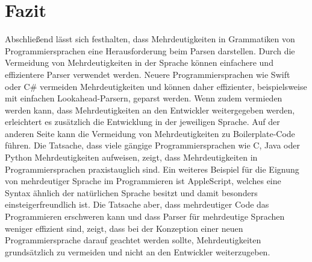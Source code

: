 \documentclass[runningheads]{llncs}
\begin{document}
    \section{Fazit}\label{sec:zusammenfassung}

    Abschließend lässt sich festhalten, dass Mehrdeutigkeiten in Grammatiken von Programmiersprachen
    eine Herausforderung beim Parsen darstellen.
    Durch die Vermeidung von Mehrdeutigkeiten in der Sprache können einfachere und effizientere Parser verwendet werden.
    Neuere Programmiersprachen wie Swift\cite{apple2024swift} oder C\# vermeiden Mehrdeutigkeiten
    und können daher effizienter, beispielsweise mit einfachen Lookahead-Parsern, geparst werden.
    Wenn zudem vermieden werden kann, dass Mehrdeutigkeiten an den Entwickler weitergegeben werden,
    erleichtert es zusätzlich die Entwicklung in der jeweiligen Sprache.
    Auf der anderen Seite kann die Vermeidung von Mehrdeutigkeiten zu Boilerplate-Code führen.
    Die Tatsache, dass viele gängige Programmiersprachen wie C, Java oder Python Mehrdeutigkeiten aufweisen,
    zeigt, dass Mehrdeutigkeiten in Programmiersprachen praxistauglich sind.
    Ein weiteres Beispiel für die Eignung von mehrdeutiger Sprache im Programmieren ist AppleScript\cite{apple2016script},
    welches eine Syntax ähnlich der natürlichen Sprache besitzt
    und damit besonders einsteigerfreundlich ist.
    Die Tatsache aber, dass mehrdeutiger Code das Programmieren erschweren kann
    und dass Parser für mehrdeutige Sprachen weniger effizient sind,
    zeigt, dass bei der Konzeption einer neuen Programmiersprache
    darauf geachtet werden sollte, Mehrdeutigkeiten grundsätzlich zu vermeiden
    und nicht an den Entwickler weiterzugeben.

%
%
%


    
    
\end{document}
